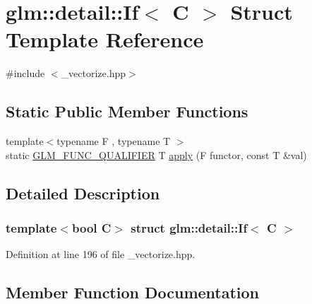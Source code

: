 \hypertarget{structglm_1_1detail_1_1_if}{}\section{glm\+:\+:detail\+:\+:If$<$ C $>$ Struct Template Reference}
\label{structglm_1_1detail_1_1_if}


{\ttfamily \#include $<$\+\_\+vectorize.\+hpp$>$}

\subsection*{Static Public Member Functions}
\begin{DoxyCompactItemize}
\item 
{\footnotesize template$<$typename F , typename T $>$ }\\static \hyperlink{setup_8hpp_a33fdea6f91c5f834105f7415e2a64407}{G\+L\+M\+\_\+\+F\+U\+N\+C\+\_\+\+Q\+U\+A\+L\+I\+F\+I\+ER} T \hyperlink{structglm_1_1detail_1_1_if_ab66c77bac87f7ffe4aa6bb761b165746}{apply} (F functor, const T \&val)
\end{DoxyCompactItemize}


\subsection{Detailed Description}
\subsubsection*{template$<$bool C$>$\newline
struct glm\+::detail\+::\+If$<$ C $>$}



Definition at line 196 of file \+\_\+vectorize.\+hpp.



\subsection{Member Function Documentation}
\mbox{\label{structglm_1_1detail_1_1_if_ab66c77bac87f7ffe4aa6bb761b165746}} 
